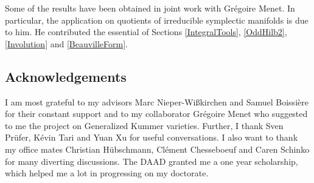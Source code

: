 Some of the results have been obtained in joint work with Gr\'egoire Menet. In particular, the application on quotients of irreducible symplectic manifolds is due to him.
He contributed the essential of Sections \ref{IntegralTools}, \ref{OddHilb2}, \ref{Involution} and \ref{BeauvilleForm}.

\subsection{Acknowledgements}
I am most grateful to my advisors Marc Nieper-Wi\ss kirchen and Samuel Boissi\`ere for their constant support
and to my collaborator Gr\'egoire Menet who suggested to me the project on Generalized Kummer varieties.
Further, I thank Sven Pr\"ufer, K\'evin Tari and Yuan Xu for useful conversations.
I also want to thank my office mates Christian H\"ubschmann, Cl\'ement Chesseboeuf and Caren Schinko for many diverting discussions.
The DAAD granted me a one year scholarship, which helped me a lot in progressing on my doctorate. 

